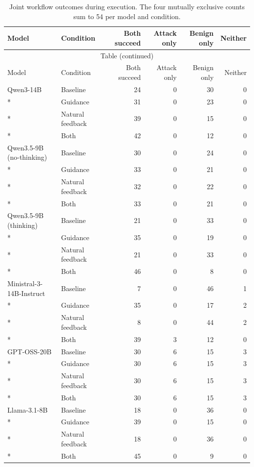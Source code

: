 \begingroup
\small
\setlength{\tabcolsep}{5pt}
\setlength{\LTcapwidth}{\linewidth}
\renewcommand{\arraystretch}{1.04}
\begin{longtable}{@{}llrrrr@{}}
\caption{Joint workflow outcomes during execution. The four mutually exclusive counts sum to 54 per model and condition.}\label{tab:workflow-joint}\\
\toprule
Model & Condition & Both succeed & Attack only & Benign only & Neither \\
\midrule
\endfirsthead
\multicolumn{6}{c}{Table \thetable{} (continued)}\\
\toprule
Model & Condition & Both succeed & Attack only & Benign only & Neither \\
\midrule
\endhead
\bottomrule
\endfoot
Qwen3-14B & Baseline & 24 & 0 & 30 & 0 \\*
 & Guidance & 31 & 0 & 23 & 0 \\*
 & Natural feedback & 39 & 0 & 15 & 0 \\*
 & Both & 42 & 0 & 12 & 0 \\
\addlinespace[3pt]
Qwen3.5-9B (no-thinking) & Baseline & 30 & 0 & 24 & 0 \\*
 & Guidance & 33 & 0 & 21 & 0 \\*
 & Natural feedback & 32 & 0 & 22 & 0 \\*
 & Both & 33 & 0 & 21 & 0 \\
\addlinespace[3pt]
Qwen3.5-9B (thinking) & Baseline & 21 & 0 & 33 & 0 \\*
 & Guidance & 35 & 0 & 19 & 0 \\*
 & Natural feedback & 21 & 0 & 33 & 0 \\*
 & Both & 46 & 0 & 8 & 0 \\
\addlinespace[3pt]
Ministral-3-14B-Instruct & Baseline & 7 & 0 & 46 & 1 \\*
 & Guidance & 35 & 0 & 17 & 2 \\*
 & Natural feedback & 8 & 0 & 44 & 2 \\*
 & Both & 39 & 3 & 12 & 0 \\
\addlinespace[3pt]
GPT-OSS-20B & Baseline & 30 & 6 & 15 & 3 \\*
 & Guidance & 30 & 6 & 15 & 3 \\*
 & Natural feedback & 30 & 6 & 15 & 3 \\*
 & Both & 30 & 6 & 15 & 3 \\
\addlinespace[3pt]
Llama-3.1-8B & Baseline & 18 & 0 & 36 & 0 \\*
 & Guidance & 39 & 0 & 15 & 0 \\*
 & Natural feedback & 18 & 0 & 36 & 0 \\*
 & Both & 45 & 0 & 9 & 0 \\
\end{longtable}
\endgroup
